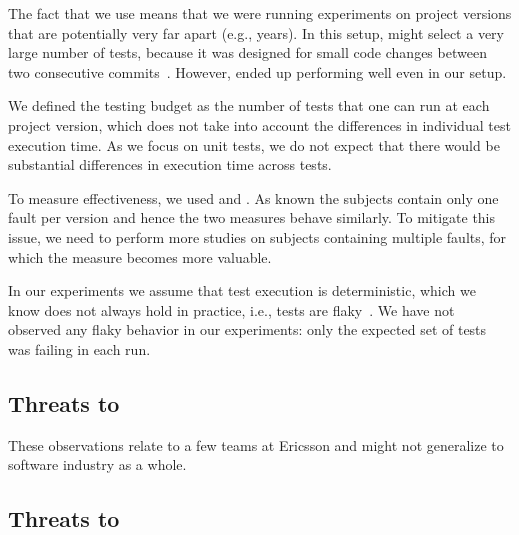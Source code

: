 The fact that we use \dfj means that we were running experiments on
project versions that are potentially very far apart (e.g., years).
In this setup, \ek might select a very large number of tests, because
it was designed for small code changes between two
consecutive commits~\cite{gligoricEk, VasicETAL17EkstaziSharp}.  However, 
\ek ended up performing well
even in our setup.

We defined the testing budget as the number of tests that one can run
at each project version, which does not take into account the
differences in individual test execution time.  As we focus on unit
tests, we do not expect that there would be substantial differences in
execution time across tests.

To measure effectiveness, we used \ttff and \apfd. As known the \dfj subjects contain only one fault per version and hence the two measures behave similarly. 
To mitigate this issue, we need to perform more studies on subjects containing multiple faults, for which the \apfd measure becomes more valuable. 

In our experiments we assume that test execution is deterministic,
which we know  does not always hold in practice, i.e.,
tests are flaky~\cite{luo2014empirical,harman2018start}.  We have not observed any flaky behavior in our
experiments: only the expected set of tests was failing in each run.

\subsection{Threats to  }

These observations relate to a few teams at Ericsson and might not generalize to software industry as a whole.

\subsection{Threats to  }